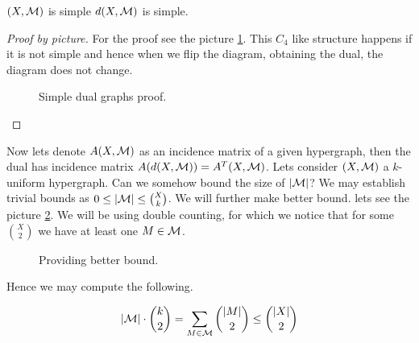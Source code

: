 \begin{lemma}
	$(X,\mathcal{M})$ is simple \ifft $d(X,\mathcal{M})$ is simple.
\end{lemma}

\begin{proof}[Proof by picture]
	For the proof see the picture \ref{simple-dual-hg}. This $C_4$ like structure happens if it is not simple and hence when we flip the diagram, obtaining the dual, the diagram does not change.
	
	\begin{figure}[!ht]\centering
		\caption{Simple dual graphs proof.}
		\label{simple-dual-hg}
	\end{figure}
\end{proof}

Now lets denote $A(X,\mathcal{M})$ as an incidence matrix of a given hypergraph, then the dual has incidence matrix $A(d(X,\mathcal{M})) = A^T(X,\mathcal{M})$. Lets consider $(X, \mathcal{M})$ a $k$-uniform hypergraph. Can we somehow bound the size of $|\mathcal{M}|$? We may establish trivial bounds as $0 \leq |\mathcal{M}| \leq \binom{X}{k}$. We will further make better bound. lets see the picture \ref{bounds}. We will be using double counting, for which we notice that for some $\binom{X}{2}$ we have at least one $M \in \mathcal{M}$.

\begin{figure}[!ht]\centering
	\caption{Providing better bound.}
	\label{bounds}
\end{figure}

\noindent Hence we may compute the following.

$$
|\mathcal{M}| \cdot \binom{k}{2} = \sum_{M \in \mathcal{M}} \binom{|M|}{2} \leq \binom{|X|}{2}
$$

